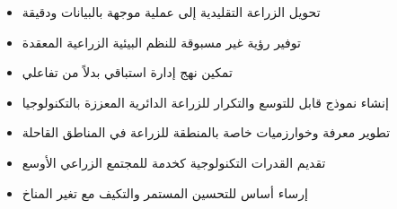 \begin{itemize}
    \item تحويل الزراعة التقليدية إلى عملية موجهة بالبيانات ودقيقة
    \item توفير رؤية غير مسبوقة للنظم البيئية الزراعية المعقدة
    \item تمكين نهج إدارة استباقي بدلاً من تفاعلي
    \item إنشاء نموذج قابل للتوسع والتكرار للزراعة الدائرية المعززة بالتكنولوجيا
    \item تطوير معرفة وخوارزميات خاصة بالمنطقة للزراعة في المناطق القاحلة
    \item تقديم القدرات التكنولوجية كخدمة للمجتمع الزراعي الأوسع
    \item إرساء أساس للتحسين المستمر والتكيف مع تغير المناخ
\end{itemize} 